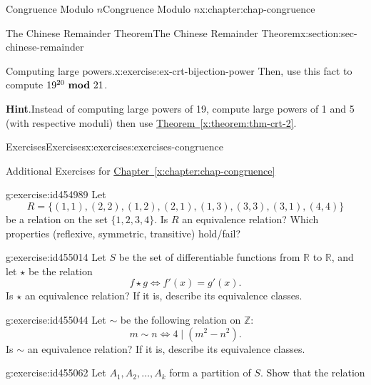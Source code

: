 \documentclass[oneside,10pt,]{book}
\newcommand{\blocktitlefont}{\relax}
\newcommand{\xreffont}{\relax}
\numberwithin{equation}{section}
\newcommand{\mmod}[1]{\ \mathrm{\bf mod}\ #1}
\begin{document}
\begin{chapterptx}{Congruence Modulo \(n\)}{}{Congruence Modulo \(n\)}{}{}{x:chapter:chap-congruence}
\begin{sectionptx}{The Chinese Remainder Theorem}{}{The Chinese Remainder Theorem}{}{}{x:section:sec-chinese-remainder}
\begin{inlineexercise}{Computing large powers.}{x:exercise:ex-crt-bijection-power}
Then, use this fact to compute \(19^{20} \mmod{21}\).%
\par\smallskip%
\noindent\textbf{\blocktitlefont Hint}.\hypertarget{g:hint:id454984}{}\quad{}Instead of computing large powers of 19, compute large powers of 1 and 5 (with respective moduli) then use \hyperref[x:theorem:thm-crt-2]{Theorem~{\xreffont\ref{x:theorem:thm-crt-2}}}.%
\end{inlineexercise}
\end{sectionptx}
%
%
\typeout{************************************************}
\typeout{************************************************}
%
\begin{exercises-section}{Exercises}{}{Exercises}{}{}{x:exercises:exercises-congruence}
\begin{introduction}{}%
Additional Exercises for \hyperref[x:chapter:chap-congruence]{Chapter~{\xreffont\ref{x:chapter:chap-congruence}}}%
\end{introduction}%
\begin{divisionexercise}{1}{}{}{g:exercise:id454989}%
Let%
\begin{equation*}
R = \{(1,1),(2,2),(1,2),(2,1),(1,3),(3,3),(3,1),(4,4)\}
\end{equation*}
be a relation on the set \(\{1,2,3,4\}\). Is \(R\) an equivalence relation? Which properties (reflexive, symmetric, transitive) hold\slash{}fail?%
\end{divisionexercise}%
\begin{divisionexercise}{2}{}{}{g:exercise:id455014}%
Let \(S\) be the set of differentiable functions from \(\mathbb{R}\) to \(\mathbb{R}\), and let \(\star\) be the relation%
\begin{equation*}
f \star g \Leftrightarrow f'(x) = g'(x)\text{.}
\end{equation*}
Is \(\star\) an equivalence relation? If it is, describe its equivalence classes.%
\end{divisionexercise}%
\begin{divisionexercise}{3}{}{}{g:exercise:id455044}%
Let \(\sim\) be the following relation on \(\mathbb{Z}\):%
\begin{equation*}
m \sim n \Leftrightarrow 4 \mid (m^2 - n^2)\text{.}
\end{equation*}
Is \(\sim\) an equivalence relation? If it is, describe its equivalence classes.%
\end{divisionexercise}%
\begin{divisionexercise}{4}{}{}{g:exercise:id455062}%
Let \(A_1, A_2, \ldots, A_k\) form a partition of \(S\). Show that the relation%

\end{divisionexercise}
\end{exercises-section}
\end{chapterptx}
\end{document}
